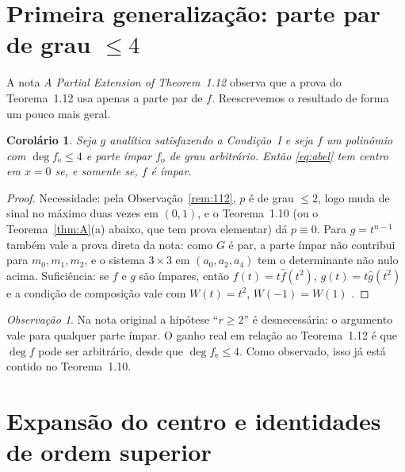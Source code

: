 \documentclass[11pt]{article}
\theoremstyle{plain}
\newtheorem{corollary}[theorem]{Corolário}
\theoremstyle{definition}
\theoremstyle{remark}
\newtheorem{remark}[theorem]{Observação}
\newcommand{\fe}{f_{\mathrm e}}
\newcommand{\fo}{f_{\mathrm o}}
\begin{document}
\section{\texorpdfstring{Primeira generalização: parte par de grau $\le 4$}{Primeira generalização: parte par de grau <= 4}}

A nota \emph{A Partial Extension of Theorem~1.12} observa que a prova do Teorema~1.12
usa apenas a parte par de $f$. Reescrevemos o resultado de forma um pouco mais
geral.

\begin{corollary}\label{cor:grau4}
Seja $g$ analítica satisfazendo a Condição~I e seja $f$ um polinômio com
$\deg\fe\le4$ e parte ímpar $\fo$ de grau arbitrário. Então \eqref{eq:abel} tem
centro em $x=0$ se, e somente se, $f$ é ímpar.
\end{corollary}

\begin{proof}
Necessidade: pela Observação~\ref{rem:112}, $p$ é de grau $\le2$, logo muda de
sinal no máximo duas vezes em $(0,1)$, e o Teorema~1.10 (ou o
Teorema~\ref{thm:A}(a) abaixo, que tem prova elementar) dá $p\equiv0$. Para
$g=t^{n-1}$ também vale a prova direta da nota: como $G$ é par, a parte ímpar não
contribui para $m_0,m_1,m_2$, e o sistema $3\times3$ em $(a_0,a_2,a_4)$ tem o
determinante não nulo acima.
Suficiência: se $f$ e $g$ são ímpares, então $f(t)=t\hat f(t^2)$,
$g(t)=t\hat g(t^2)$ e a condição de composição vale com $W(t)=t^2$,
$W(-1)=W(1)$ \cite{AL87}.
\end{proof}

\begin{remark}
Na nota original a hipótese ``$r\ge2$'' é desnecessária: o argumento vale para
qualquer parte ímpar. O ganho real em relação ao Teorema~1.12 é que $\deg f$ pode
ser arbitrário, desde que $\deg\fe\le4$. Como observado, isso já está contido no
Teorema~1.10.
\end{remark}

\section{Expansão do centro e identidades de ordem superior}\label{sec:identidades}
\end{document}
